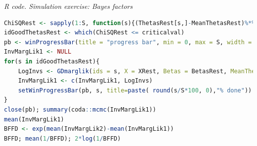 \begin{tcolorbox}[enhanced,width=4.67in,center upper,
	fontupper=\large\bfseries,drop shadow southwest,sharp corners]
	\textit{R code. Simulation exercise: Bayes factors}
	\begin{VF}
		\begin{lstlisting}[language=R]
ChiSQRest <- sapply(1:S, function(s){(ThetasRest[s,]-MeanThetasRest)%*%iVarThetasRest%*%(ThetasRest[s,]-MeanThetasRest)})
idGoodThetasRest <- which(ChiSQRest <= criticalval)
pb <- winProgressBar(title = "progress bar", min = 0, max = S, width = 300)
InvMargLik1 <- NULL
for(s in idGoodThetasRest){
	LogInvs <- GDmarglik(ids = s, X = XRest, Betas = BetasRest, MeanThetas = MeanThetasRest, VarThetas = VarThetasRest, sig2Post = sig2PostRest)
	InvMargLik1 <- c(InvMargLik1, LogInvs)
	setWinProgressBar(pb, s, title=paste( round(s/S*100, 0),"% done"))
}
close(pb); summary(coda::mcmc(InvMargLik1))
mean(InvMargLik1)
BFFD <- exp(mean(InvMargLik2)-mean(InvMargLik1))
BFFD; mean(1/BFFD); 2*log(1/BFFD)
\end{lstlisting}
	\end{VF}
\end{tcolorbox}  

